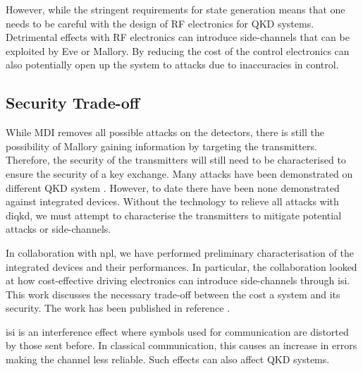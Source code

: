 

However, while the stringent requirements for state generation means that one needs to be careful with the design of RF electronics for \ac{QKD} systems. Detrimental effects with RF electronics can introduce side-channels that can be exploited by Eve or Mallory. By reducing the cost of the control electronics can also potentially open up the system to attacks due to inaccuracies in control.

\subsection{Security Trade-off}

While \ac{MDI} removes all possible attacks on the detectors, there is still the possibility of Mallory gaining information by targeting the transmitters. Therefore, the security of the transmitters will still need to be characterised to ensure the security of a key exchange. Many attacks have been demonstrated on different \ac{QKD} system \cite{makarov2019}. However, to date there have been none demonstrated against integrated devices. Without the technology to relieve all attacks with \ac{diqkd}, we must attempt to characterise the transmitters to mitigate potential attacks or side-channels.

In collaboration with \ac{npl}, we have performed preliminary characterisation of the integrated devices and their performances. In particular, the collaboration looked at how cost-effective driving electronics can introduce side-channels through \ac{isi}. This work discusses the necessary trade-off between the cost a system and its security. The work has been published in reference \cite{vaquero2018}.

\Ac{isi} is an interference effect where symbols used for communication are distorted by those sent before. In classical communication, this causes an increase in errors making the channel less reliable. Such effects can also affect \ac{QKD} systems.



